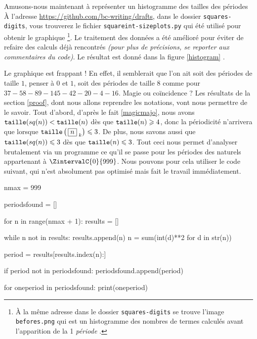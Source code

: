 \medskip

Amusons-nous maintenant à représenter un histogramme des tailles des \og périodes \fg{}
À l'adresse \url{https://github.com/bc-writing/drafts}, dans le dossier \texttt{squares-digits}, vous trouverez le fichier \texttt{squareint-sizeplots.py} qui été utilisé pour obtenir le graphique
\footnote{
	À la même adresse dans le dossier \texttt{squares-digits} se trouve l'image \texttt{befores.png} qui est un histogramme des nombres de termes calculés avant l'apparition de la 1\iere{} \emph{\og période \fg{}}.
}.
Le traitement des données a été amélioré pour éviter de refaire des calculs déjà rencontrés \emph{(pour plus de précisions, se reporter aux commentaires du code)}.
Le résultat est donné dans la figure \ref{histogram} .



\medskip

Le graphique est frappant ! En effet, il semblerait que l'on ait soit des périodes de taille $1$, penser à $0$ et $1$, soit des périodes de taille $8$ comme pour $37 - 58 - 89 - 145 - 42 - 20 - 4 - 16$.
Magie ou coïncidence ? Les résultats de la section \ref{proof}, dont nous allons reprendre les notations, vont nous permettre de le savoir.
Tout d'abord,  d'après le fait \ref{magicmajo}, nous avons $\operatorname{\text{\normalfont\texttt{taille}}}(sq(n)) < \operatorname{\text{\normalfont\texttt{taille}}}(n)$ dès que $\operatorname{\text{\normalfont\texttt{taille}}}(n) \geqslant 4$, donc la périodicité n'arrivera que lorsque $\operatorname{\text{\normalfont\texttt{taille}}}\left( \, \fbox{$n$}_{\,\,k} \right) \leqslant 3$.
De plus, nous savons aussi que $\operatorname{\text{\normalfont\texttt{taille}}}(sq(n)) \leqslant 3$ dès que $\operatorname{\text{\normalfont\texttt{taille}}}(n) \leqslant 3$.
Tout ceci nous permet d'analyser brutalement via un programme ce qu'il se passe pour les périodes des naturels appartenant à $\ZintervalC{0}{999}$. Nous pouvons pour cela utiliser le code suivant, qui n'est absolument pas optimisé mais fait le travail immédiatement.


\newpage

\begin{rawcode}
nmax = 999

periodsfound = []

for n in range(nmax + 1):
    results = []

    while n not in results:
        results.append(n)
        n = sum(int(d)**2 for d in str(n))

    period = results[results.index(n):]

    if period not in periodsfound:
        periodsfound.append(period)

for oneperiod in periodsfound:
    print(oneperiod)
\end{rawcode}



